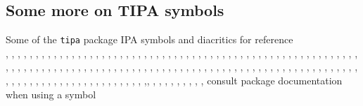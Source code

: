 \documentclass{article}
\begin{document}
\subsection{Some more on TIPA symbols}
\pex Some of the \verb=tipa= package IPA symbols and diacritics for reference\\
\a \textbabygamma, \textglotstop, \textrtailn, \textbarb, \texthalflength, \textrtailr, \textbarc, \texthardsign, \textrtails, \textbard, \texthooktop, \textrtailt, \textbardotlessj, \texthtb, \textrtailz, \textbarg, \texthtbardotlessj, \textrthook, \textbarglotstop, \texthtc, \textsca, \textbari, \texthtd, \textscb, \textbarl, \texthtg, \textsce, \textbaro, \texthth, \textscg, \textbarrevglotstop, \texththeng, \textsch, \textbaru, \texthtk, \textschwa, \textbeltl, \texthtp, \textsci, \textbeta, \texthtq, \textscj, \textbullseye, \texthtrtaild, \textscl, \textceltpal, \texthtscg, \textscn, \textchi, \texthtt, \textscoelig, \textcloseepsilon, \texthvlig, \textscomega, \textcloseomega, \textinvglotstop, \textscr, \textcloserevepsilon, \textinvscr, \textscripta, \textcommatailz, \textiota, \textscriptg, \textcorner, \textlambda, \textscriptv, \textcrb, \textlengthmark, \textscu, \textcrd, \textlhookt, \textscy, \textcrg, \textlhtlongi, \textsecstress, \textcrh, \textlhtlongy, \textsoftsign, \textcrinvglotstop, \textlonglegr, \textstretchc, \textcrlambda, \textlptr, \texttctclig, \textcrtwo, \textltailm, \textteshlig, \textctc, \textltailn, \texttheta, \textctd, \textltilde, \textthorn, \textctdctzlig, \textlyoghlig, \texttoneletterstem, \textctesh, \textObardotlessj, \texttslig, \textctj, \textOlyoghlig, \textturna, \textctn, \textomega, \textturncelig, \textctt, \textopencorner, \textturnh, \textcttctclig, \textopeno, \textturnk, \textctyogh, \textpalhook, \textturnlonglegr, \textctz, \textphi, \textturnm, \textdctzlig, \textpipe, \textturnmrleg, \textdoublebaresh, \textprimstress, \textturnr, \textdoublebarpipe, \textraiseglotstop, \textturnrrtail, \textdoublebarslash, \textraisevibyi, \textturnscripta, \textdoublepipe, \textramshorns, \textturnt, \textdoublevertline, \textrevapostrophe, \textturnv, \textdownstep, \textreve, \textturnw, \textdyoghlig, \textrevepsilon, \textturny, \textdzlig ,\textrevglotstop, \textupsilon, \textepsilon, \textrevyogh, \textupstep, \textesh, \textrhookrevepsilon, \textvertline, \textfishhookr, \textrhookschwa, \textvibyi
\a consult package documentation when using a symbol
\xe
\end{document}
